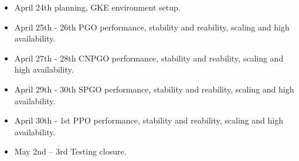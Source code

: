 \begin{itemize}
\begin{itemize}
\begin{itemize}
                  \item April 24th planning, GKE environment setup.
                  \item April 25th - 26th PGO performance, stability and reability, scaling and high availability.
                  \item April 27th - 28th CNPGO performance, stability and reability, scaling and high availability.
                  \item April 29th - 30th SPGO performance, stability and reability, scaling and high availability.
                  \item April 30th - 1st PPO performance, stability and reability, scaling and high availability.
                  \item May 2nd – 3rd Testing closure.
                \end{itemize}
        \end{itemize}
\end{itemize}







